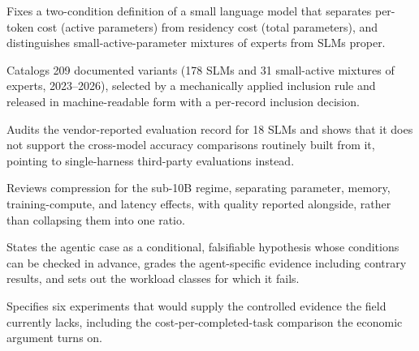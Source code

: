 \documentclass[a4paper,10pt]{article}
\begin{document}
{  \begin{highlights}
  \item Fixes a two-condition definition of a small language model that separates per-token cost (active parameters) from residency cost (total parameters), and distinguishes small-active-parameter mixtures of experts from SLMs proper.
  \item Catalogs 209 documented variants (178 SLMs and 31 small-active mixtures of experts, 2023--2026), selected by a mechanically applied inclusion rule and released in machine-readable form with a per-record inclusion decision.
  \item Audits the vendor-reported evaluation record for 18 SLMs and shows that it does not support the cross-model accuracy comparisons routinely built from it, pointing to single-harness third-party evaluations instead.
  \item Reviews compression for the sub-10B regime, separating parameter, memory, training-compute, and latency effects, with quality reported alongside, rather than collapsing them into one ratio.
  \item States the agentic case as a conditional, falsifiable hypothesis whose conditions can be checked in advance, grades the agent-specific evidence including contrary results, and sets out the workload classes for which it fails.
  \item Specifies six experiments that would supply the controlled evidence the field currently lacks, including the cost-per-completed-task comparison the economic argument turns on.
  \end{highlights}

  \begin{keywords}
  \paperkeywords
  \end{keywords}
}

\glsresetall













\appendix



















\printjournalbibliography
\end{document}
